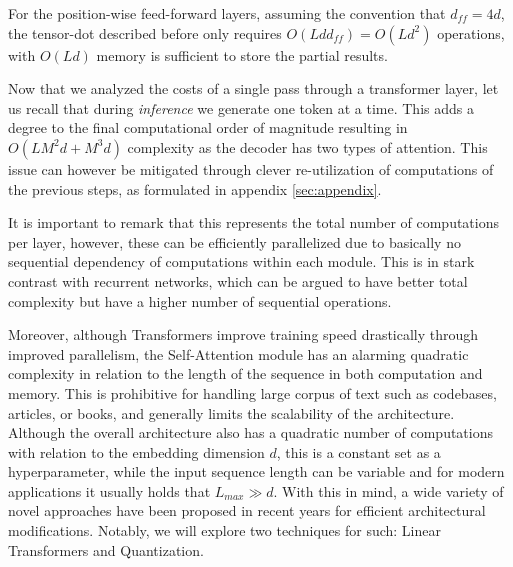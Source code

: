 For the position-wise feed-forward layers, assuming the convention that $d_{ff} = 4d$, the tensor-dot described before only requires $O(Ldd_{ff}) = O(Ld^2)$ operations, with $O(Ld)$ memory is sufficient to store the partial results.



\vspace{0.5em}

Now that we analyzed the costs of a single pass through a transformer layer, let us recall that during \textit{inference} we generate one token at a time. This adds a degree to the final computational order of magnitude resulting in $O(LM^2d + M^3d)$ complexity as the decoder has two types of attention. This issue can however be mitigated through clever re-utilization of computations of the previous steps, as formulated in   appendix \ref{sec:appendix}.

\vspace{0.5em}

It is important to remark that this represents the total number of computations per layer, however, these can be efficiently parallelized due to basically no sequential dependency of computations within each module. This is in stark contrast with recurrent networks, which can be argued to have better total complexity but have a higher number of sequential operations.

Moreover, although Transformers improve training speed drastically through improved parallelism, the Self-Attention module has an alarming quadratic complexity in relation to the length of the sequence in both computation and memory. 
This is prohibitive for handling large corpus of text such as codebases, articles, or books, and generally limits the scalability of the architecture. 
Although the overall architecture also has a quadratic number of computations with relation to the embedding dimension $d$, this is a constant set as a hyperparameter, while the input sequence length can be variable and for modern applications it usually holds that $L_{max} \gg d$. With this in mind, a wide variety of novel approaches have been proposed in recent years for efficient architectural modifications. Notably, we will explore two techniques for such: Linear Transformers and Quantization.
